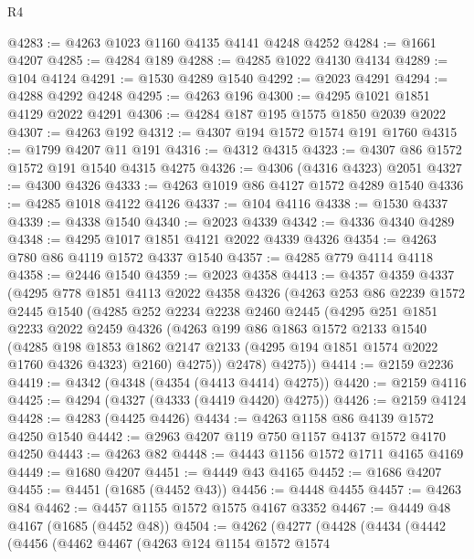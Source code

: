 \begin{lexlean}{R4}
\begin{coremodule}
@4283 := @4263 @1023 @1160 @4135 @4141 @4248 @4252
@4284 := @1661 @4207
@4285 := @4284 @189
@4288 := @4285 @1022 @4130 @4134
@4289 := @104 @4124
@4291 := @1530 @4289 @1540
@4292 := @2023 @4291
@4294 := @4288 @4292 @4248
@4295 := @4263 @196
@4300 := @4295 @1021 @1851 @4129 @2022 @4291
@4306 := @4284 @187 @195 @1575 @1850 @2039 @2022
@4307 := @4263 @192
@4312 := @4307 @194 @1572 @1574 @191 @1760
@4315 := @1799 @4207 @11 @191
@4316 := @4312 @4315
@4323 := @4307 @86 @1572 @1572 @191 @1540 @4315 @4275
@4326 := @4306 (@4316 @4323) @2051
@4327 := @4300 @4326
@4333 := @4263 @1019 @86 @4127 @1572 @4289 @1540
@4336 := @4285 @1018 @4122 @4126
@4337 := @104 @4116
@4338 := @1530 @4337
@4339 := @4338 @1540
@4340 := @2023 @4339
@4342 := @4336 @4340 @4289
@4348 := @4295 @1017 @1851 @4121 @2022 @4339 @4326
@4354 := @4263 @780 @86 @4119 @1572 @4337 @1540
@4357 := @4285 @779 @4114 @4118
@4358 := @2446 @1540
@4359 := @2023 @4358
@4413 := @4357
    @4359
    @4337
    (@4295
      @778
      @1851
      @4113
      @2022
      @4358
      @4326
      (@4263
        @253
        @86
        @2239
        @1572
        @2445
        @1540
        (@4285
          @252
          @2234
          @2238
          @2460
          @2445
          (@4295
            @251
            @1851
            @2233
            @2022
            @2459
            @4326
            (@4263
              @199
              @86
              @1863
              @1572
              @2133
              @1540
              (@4285
                @198
                @1853
                @1862
                @2147
                @2133
                (@4295 @194 @1851 @1574 @2022 @1760 @4326 @4323)
                @2160)
              @4275))
          @2478)
        @4275))
@4414 := @2159 @2236
@4419 := @4342 (@4348 (@4354 (@4413 @4414) @4275))
@4420 := @2159 @4116
@4425 := @4294 (@4327 (@4333 (@4419 @4420) @4275))
@4426 := @2159 @4124
@4428 := @4283 (@4425 @4426)
@4434 := @4263 @1158 @86 @4139 @1572 @4250 @1540
@4442 := @2963 @4207 @119 @750 @1157 @4137 @1572 @4170 @4250
@4443 := @4263 @82
@4448 := @4443 @1156 @1572 @1711 @4165 @4169
@4449 := @1680 @4207
@4451 := @4449 @43 @4165
@4452 := @1686 @4207
@4455 := @4451 (@1685 (@4452 @43))
@4456 := @4448 @4455
@4457 := @4263 @84
@4462 := @4457 @1155 @1572 @1575 @4167 @3352
@4467 := @4449 @48 @4167 (@1685 (@4452 @48))
@4504 := @4262
    (@4277
      (@4428
        (@4434
          (@4442
            (@4456
              (@4462
                @4467
                (@4263
                  @124
                  @1154
                  @1572
                  @1574

\end{coremodule}
\end{lexlean}
